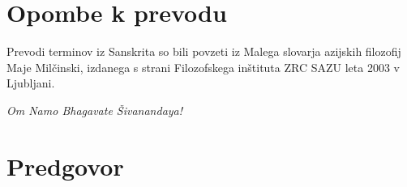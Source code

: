 
\vspace{5mm}



%
%        






\section*{Opombe k prevodu}
Prevodi terminov iz Sanskrita so bili povzeti iz Malega slovarja azijskih filozofij Maje Milčinski, izdanega s strani Filozofskega inštituta ZRC SAZU leta 2003 v Ljubljani.

\emph{Om Namo Bhagavate Šivanandaya!}

\section*{Predgovor}


